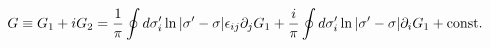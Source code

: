 \begin{equation}
\label{disprel}
G\equiv G_1+iG_2=\frac{1}{\pi}\oint d\sigma_i'\ln |\sigma'-\sigma |\epsilon_{ij}\partial_jG_1+\frac{i}{\pi}\oint d\sigma'_i\ln |\sigma'-\sigma |\partial_iG_1+{\rm const.}
\end{equation}

